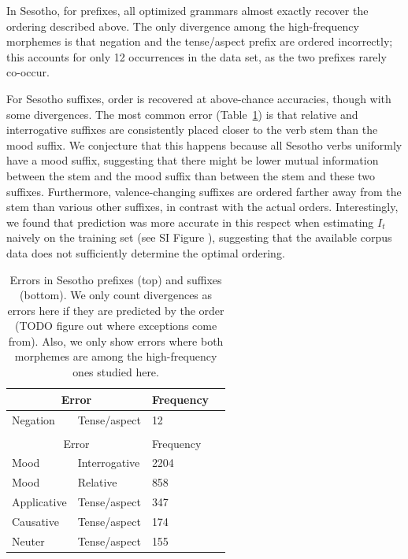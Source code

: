 In Sesotho, for prefixes, all optimized grammars almost exactly recover the ordering described above.
The only divergence among the high-frequency morphemes is that negation and the tense/aspect prefix are ordered incorrectly; this accounts for only 12 occurrences in the data set, as the two prefixes rarely co-occur.

For Sesotho suffixes, order is recovered at above-chance accuracies, though with some divergences.
The most common error (Table~\ref{tab:sesotho-prefix-err-analysis}) is that relative and interrogative suffixes are consistently placed closer to the verb stem than the mood suffix.
We conjecture that this happens because all Sesotho verbs uniformly have a mood suffix, suggesting that there might be lower mutual information between the stem and the mood suffix than between the stem and these two suffixes.
Furthermore, valence-changing suffixes are ordered farther away from the stem than various other suffixes, in contrast with the actual orders.
Interestingly, we found that prediction was more accurate in this respect when estimating $I_t$ naively on the training set (see SI Figure \REF), suggesting that the available corpus data does not sufficiently determine the optimal ordering.

\begin{table}
    \centering
    \begin{tabular}{ll|ll}
    \multicolumn{2}{c|}{Error} & Frequency \\ \hline\hline
Negation & Tense/aspect & 12 \\
\\
    \multicolumn{2}{c|}{Error} & Frequency \\ \hline\hline
Mood & Interrogative & 2204 \\
Mood & Relative & 858 \\
Applicative & Tense/aspect & 347 \\
Causative & Tense/aspect & 174 \\
Neuter & Tense/aspect & 155 \\
\end{tabular}
    \caption{Errors in Sesotho prefixes (top) and suffixes (bottom). We only count divergences as errors here if they are predicted by the order (TODO figure out where exceptions come from). Also, we only show errors where both morphemes are among the high-frequency ones studied here.}
    \label{tab:sesotho-prefix-err-analysis}
\end{table}




